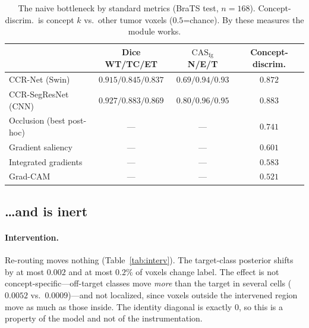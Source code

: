 \documentclass[runningheads]{llncs}
\newcommand{\casfg}{\mathrm{CAS}_{\mathrm{fg}}}
\begin{document}
\begin{table}[t]
\centering
\caption{The naive bottleneck by standard metrics (BraTS test, $n{=}168$). Concept-discrim.\
is concept $k$ vs.\ other tumor voxels ($0.5$=chance). By these measures the module works.}
\label{tab:v0}
\begin{tabular}{lccc}
\toprule
& Dice WT/TC/ET & $\casfg$ N/E/T & Concept-discrim. \\
\midrule
CCR-Net (Swin)        & $0.915/0.845/0.837$ & $0.69/0.94/0.93$ & $0.872$ \\
CCR-SegResNet (CNN)   & $0.927/0.883/0.869$ & $0.80/0.96/0.95$ & $0.883$ \\
\midrule
Occlusion (best post-hoc) & --- & --- & $0.741$ \\
Gradient saliency         & --- & --- & $0.601$ \\
Integrated gradients      & --- & --- & $0.583$ \\
Grad-CAM                  & --- & --- & $0.521$ \\
\bottomrule
\end{tabular}
\end{table}

\subsection{\ldots and is inert}\label{sec:inert}
\paragraph{Intervention.} Re-routing moves nothing (Table~\ref{tab:interv}). The target-class
posterior shifts by at most $0.002$ and at most $0.2\%$ of voxels change label. The effect is
not concept-specific---off-target classes move \emph{more} than the target in several cells
($0.0052$ vs.\ $0.0009$)---and not localized, since voxels outside the intervened region move
as much as those inside. The identity diagonal is exactly $0$, so this is a property of the
model and not of the instrumentation.
\end{document}
